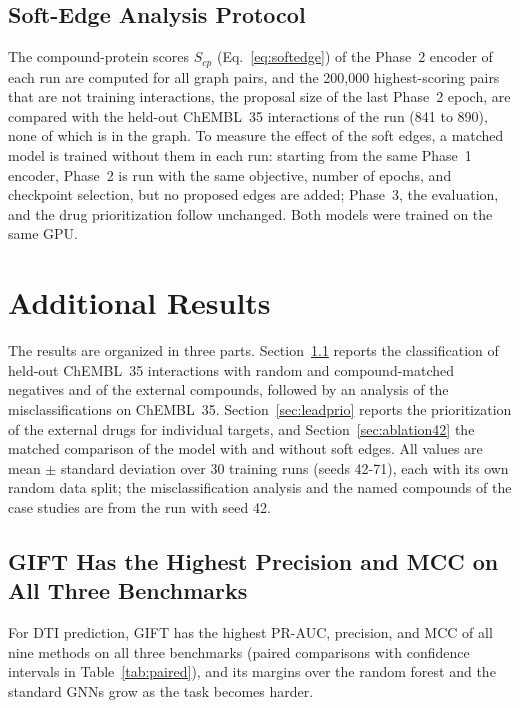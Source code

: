 \documentclass[11pt,letterpaper]{article}
\begin{document}
\subsection{Soft-Edge Analysis Protocol}
\label{sec:softedge_methods}
The compound-protein scores $S_{cp}$ (Eq.~\eqref{eq:softedge}) of the Phase~2 encoder of each run are computed for all graph pairs, and the 200,000 highest-scoring pairs that are not training interactions, the proposal size of the last Phase~2 epoch, are compared with the held-out ChEMBL~35 interactions of the run (841 to 890), none of which is in the graph. To measure the effect of the soft edges, a matched model is trained without them in each run: starting from the same Phase~1 encoder, Phase~2 is run with the same objective, number of epochs, and checkpoint selection, but no proposed edges are added; Phase~3, the evaluation, and the drug prioritization follow unchanged. Both models were trained on the same GPU.

\FloatBarrier
\section{Additional Results}
\label{sec:results}

The results are organized in three parts. Section~\ref{sec:classification} reports the classification of held-out ChEMBL~35 interactions with random and compound-matched negatives and of the external compounds, followed by an analysis of the misclassifications on ChEMBL~35. Section~\ref{sec:leadprio} reports the prioritization of the external drugs for individual targets, and Section~\ref{sec:ablation42} the matched comparison of the model with and without soft edges. All values are mean $\pm$ standard deviation over 30 training runs (seeds 42-71), each with its own random data split; the misclassification analysis and the named compounds of the case studies are from the run with seed 42.

\subsection{GIFT Has the Highest Precision and MCC on All Three Benchmarks}
\label{sec:classification}

For DTI prediction, GIFT has the highest PR-AUC, precision, and MCC of all nine methods on all three benchmarks (paired comparisons with confidence intervals in Table~\ref{tab:paired}), and its margins over the random forest and the standard GNNs grow as the task becomes harder.
\end{document}
